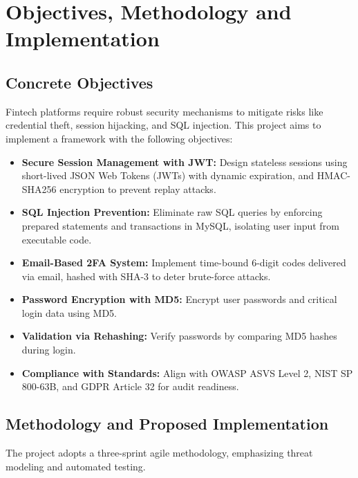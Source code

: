 \section{Objectives, Methodology and Implementation}  
\subsection{Concrete Objectives}  
Fintech platforms require robust security mechanisms to mitigate risks like credential theft, session hijacking, and SQL injection. This project aims to implement a framework with the following objectives:  

\begin{itemize}  
    \item \textbf{Secure Session Management with JWT:} Design stateless sessions using short-lived JSON Web Tokens (JWTs) with dynamic expiration, and HMAC-SHA256 encryption to prevent replay attacks.  
    \item \textbf{SQL Injection Prevention:} Eliminate raw SQL queries by enforcing prepared statements and transactions in MySQL, isolating user input from executable code.  
    \item \textbf{Email-Based 2FA System:} Implement time-bound 6-digit codes delivered via email, hashed with SHA-3 to deter brute-force attacks.  
    \item \textbf{Password Encryption with MD5:} Encrypt user passwords and critical login data using MD5.  
    \item \textbf{Validation via Rehashing:} Verify passwords by comparing MD5 hashes during login.  
    \item \textbf{Compliance with Standards:} Align with OWASP ASVS Level 2, NIST SP 800-63B, and GDPR Article 32 for audit readiness.  
\end{itemize}  

\subsection{Methodology and Proposed Implementation}  
The project adopts a three-sprint agile methodology, emphasizing threat modeling and automated testing.  

